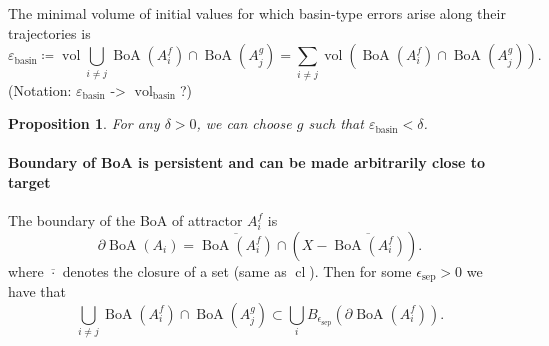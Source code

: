 \documentclass{article}
\newcommand{\ascomment}[1]{\textcolor{ascolor}{(#1)}}
\newtheorem{proposition}{Proposition}
\theoremstyle{definition} \newtheorem{definition}{Definition}
\theoremstyle{remark} \newtheorem{remark}{Remark}
\newcommand{\cl}{\operatorname{cl}}
\newcommand{\vol}{\operatorname{vol}}
\newcommand{\boa}{\operatorname{BoA}}
\newcounter{ct}
\begin{document}
The minimal volume of initial values for which basin-type errors arise along their trajectories is 
\[\varepsilon_{\operatorname{basin}} \coloneqq \vol \bigcup_{i \neq j}\boa(A_i^f)\cap\boa(A_j^g) = \sum_{i \neq j} \vol\left(\boa(A_i^f)\cap\boa(A_j^g)\right).\] %
\ascomment{Notation: $\varepsilon_{\operatorname{basin}}$ -> $\operatorname{vol}_{\operatorname{basin}}$?}

\begin{proposition}\label{prop:min_sep_bound}
For any $\delta>0$, we can choose $g$ such that $\varepsilon_{\operatorname{basin}}<\delta$.
\end{proposition}


\paragraph{Boundary of BoA is persistent and can be made arbitrarily close to target}%
The boundary of the BoA of attractor $A_i^f$ is %
\[\partial\boa(A_i) = \overline{\boa(A_i^f)} \cap (X - \overline{\boa(A_i^f)}).\]
where \(\overline{\cdot}\) denotes the closure of a set (same as \(\cl\)). %
%
Then for some  $\epsilon_{\operatorname{sep}}>0$ we have that 
\begin{equation}\label{eq:separatrixoverlap}
\bigcup_{i\neq j} \boa(A_i^f)\cap\boa(A_j^g) \subset \bigcup_i B_{\epsilon_{\operatorname{sep}}}(\partial\boa(A_i^f)). 
\end{equation}

\end{document}
